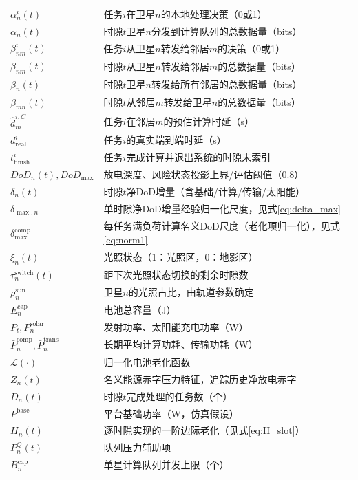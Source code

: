 \documentclass[a4paper,11pt]{article}
\begin{document}
\begin{table}[t]
\begin{tabular}{ll}
$\alpha^i_n(t)$ & 任务$i$在卫星$n$的本地处理决策（0或1） \\
$\alpha_n(t)$ & 时隙$t$卫星$n$分发到计算队列的总数据量（bits） \\
$\beta^i_{nm}(t)$ & 任务$i$从卫星$n$转发给邻居$m$的决策（0或1） \\
$\beta_{nm}(t)$ & 时隙$t$从卫星$n$转发给邻居$m$的总数据量（bits） \\
$\beta_n(t)$ & 时隙$t$卫星$n$转发给所有邻居的总数据量（bits） \\
$\beta_{mn}(t)$ & 时隙$t$从邻居$m$转发给卫星$n$的总数据量（bits） \\
$\hat{d}^{i,C}_m$ & 任务$i$在邻居$m$的预估计算时延（s） \\
$d^i_{\mathrm{real}}$ & 任务$i$的真实端到端时延（s） \\
$t^i_{\mathrm{finish}}$ & 任务$i$完成计算并退出系统的时隙末索引 \\
$DoD_n(t), DoD_{\max}$ & 放电深度、风险状态投影上界/评估阈值（0.8） \\
$\delta_n(t)$ & 时隙$t$净DoD增量（含基础/计算/传输/太阳能） \\
$\delta_{\max,n}$ & 单时隙净DoD增量经验归一化尺度，见式\eqref{eq:delta_max} \\
$\delta^{\mathrm{comp}}_{\max}$ & 每任务满负荷计算名义DoD尺度（老化项归一化），见式\eqref{eq:norm1} \\
$\xi_n(t)$ & 光照状态（1：光照区，0：地影区） \\
$\tau^{\mathrm{switch}}_n(t)$ & 距下次光照状态切换的剩余时隙数 \\
$\rho^{\mathrm{sun}}_n$ & 卫星$n$的光照占比，由轨道参数确定 \\
$E^{\mathrm{cap}}_n$ & 电池总容量（J） \\
$P_t, P^{\mathrm{solar}}_n$ & 发射功率、太阳能充电功率（W） \\
$\bar{P}^{\mathrm{comp}}_n, \bar{P}^{\mathrm{trans}}_n$ & 长期平均计算功耗、传输功耗（W） \\
$\mathcal{L}(\cdot)$ & 归一化电池老化函数 \\
$Z_n(t)$ & 名义能源赤字压力特征，追踪历史净放电赤字 \\
$D_n(t)$ & 时隙$t$完成处理的任务数（个） \\
$P^{\mathrm{base}}$ & 平台基础功率（W，仿真假设） \\
$H_n(t)$ & 逐时隙实现的一阶边际老化（见式\eqref{eq:H_slot}） \\
$P^Q_n(t)$ & 队列压力辅助项 \\
$B^{\mathrm{cap}}_n$ & 单星计算队列并发上限（个） \\

\end{tabular}
\end{table}
\end{document}
